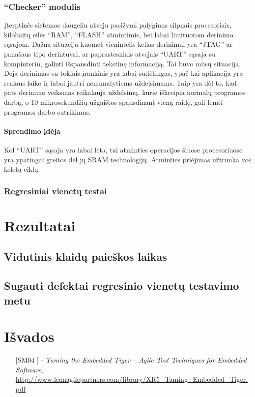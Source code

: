 \documentclass[12pt, a4paper, lithuanian, final]{article}
\begin{document}
\subsubsection{"`Checker"' modulis}

Įterptinės sistemos daugeliu atveju pasižymi palyginus silpnais procesoriais, kilobaitų eilės "`RAM"', "`FLASH"' atmintimis, bei labai limituotom derinimo sąsajom.
Dažna situacija kuomet vienintelis kelias derinimui yra "`JTAG"' ar panašaus tipo derintuvai, ar paprastesniais atvejais "`UART"' sąsaja su kompiuteriu, galinti išspausdinti tekstinę informaciją.
Tai buvo mūsų situacija.
Deja derinimas su tokiais įrankiais yra labai sudėtingas, ypač kai aplikacija yra realaus laiko ir labai jautri nenumatytiems uždelsimams.
Taip yra dėl to, kad pats derinimo veiksmas reikalauja uždelsimų, kurie iškreipia normalų programos darbą, o 10 mikrosekundžių užgaištos spausdinant vieną raidę, gali lemti programos darbo sutrikimus.

\paragraph{Sprendimo įdėja}
Kol "`UART"' sąsaja yra labai lėta, tai atminties operacijos šiuose procesoriuose yra ypatingai greitos dėl jų SRAM technologijų.
Atminties priėjimas užtrunka vos keletą ciklų.









\subsubsection{Regresiniai vienetų testai}








\section{Rezultatai}


\subsection{Vidutinis klaidų paieškos laikas}

\subsection{Sugauti defektai regresinio vienetų testavimo metu}



\section{Išvados}


\begin{itemize}
	\item [[SM04]] - \textit{Taming the Embedded Tiger – Agile Test Techniques for Embedded Software}, \url{http://www.leanagilepartners.com/library/XR5_Taming_Embedded_Tiger.pdf}

\end{itemize}
\end{document}
